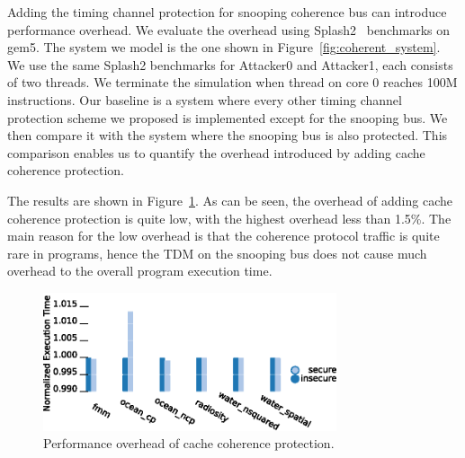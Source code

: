 Adding the timing channel protection for snooping coherence bus can introduce 
performance overhead. We evaluate the overhead using Splash2~\cite{splash2} benchmarks on 
gem5. The system we model is the one shown in Figure~\ref{fig:coherent_system}.
We use the same Splash2 benchmarks for Attacker0 and Attacker1, each consists 
of two threads. We terminate the simulation
when thread on core 0 reaches 100M instructions.  Our baseline is a system 
where every other timing channel protection scheme we proposed is implemented 
except for the snooping bus.
We then compare it with the system where the snooping bus is also protected. 
This comparison enables us to quantify the overhead introduced by adding 
cache coherence protection. 

The results are shown in Figure~\ref{fig:splash2}. As can be seen, the overhead 
of adding cache coherence protection is
quite low, with the highest overhead less than 1.5\%. 
The main reason for the low overhead is that the coherence protocol traffic 
is quite rare in programs, hence the TDM on the
snooping bus does not cause much overhead to the overall program execution 
time.

\begin{figure}
    \begin{center}
        \includegraphics[width=3.4in]{figs/SPLASH.eps}
        \caption{Performance overhead of cache coherence protection.}
        \label{fig:splash2}
		\vspace{-0.2in}
    \end{center}
\end{figure}
